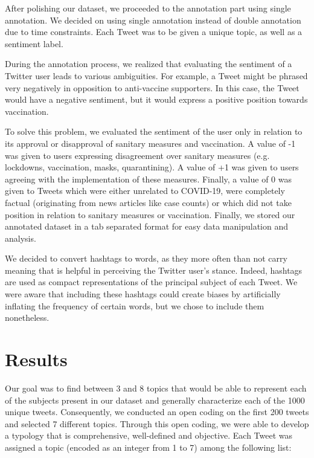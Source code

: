 \documentclass[letterpaper]{article} %
\begin{document}
After polishing our dataset, we proceeded to the annotation part using single annotation. We decided on using single annotation instead of double annotation due to time constraints. Each Tweet was to be given a unique topic, as well as a sentiment label.

During the annotation process, we realized that evaluating the sentiment of a Twitter user leads to various ambiguities. For example, a Tweet might be phrased very negatively in opposition to anti-vaccine supporters. In this case, the Tweet would have a negative sentiment, but it would express a positive position towards vaccination. 

To solve this problem, we evaluated the sentiment of the user only in relation to its approval or disapproval of sanitary measures and vaccination. A value of -1 was given to users expressing disagreement over sanitary measures (e.g. lockdowns, vaccination, masks, quarantining). A value of +1 was given to users agreeing with the implementation of these measures. Finally, a value of 0 was given to Tweets which were either unrelated to COVID-19, were completely factual (originating from news articles like case counts) or which did not take position in relation to sanitary measures or vaccination. Finally, we stored our annotated dataset in a tab separated format for easy data manipulation and analysis. 

We decided to convert hashtags to words, as they more often than not carry meaning that is helpful in perceiving the Twitter user's stance. Indeed, hashtags are used as compact representations of the principal subject of each Tweet. We were aware that including these hashtags could create biases by artificially inflating the frequency of certain words, but we chose to include them nonetheless. 

\section{Results}




Our goal was to find between 3 and 8 topics that would be able to represent each of the subjects present in our dataset and generally characterize each of the 1000 unique tweets. Consequently, we conducted an open coding on the first 200 tweets and selected 7 different topics. Through this open coding, we were able to develop a typology that is comprehensive, well-defined and objective. Each Tweet was assigned a topic (encoded as an integer from 1 to 7) among the following list: 
\end{document}
